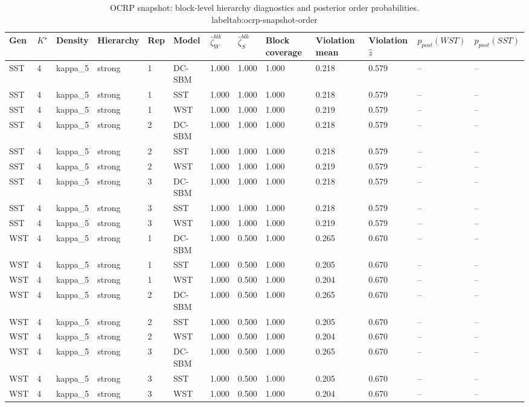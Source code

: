 \begin{table}[!h]
\centering
\caption{OCRP snapshot: block-level hierarchy diagnostics and posterior order probabilities.\\label{tab:ocrp-snapshot-order}}
\centering
\begin{tabular}[t]{lllllllllllll}
\toprule
Gen & $K^\star$ & Density & Hierarchy & Rep & Model & $\widehat\zeta_W^{blk}$ & $\widehat\zeta_S^{blk}$ & Block coverage & Violation mean & Violation $\hat z$ & $p_{post}(WST)$ & $p_{post}(SST)$\\
\midrule
SST & 4 & kappa_5 & strong & 1 & DC-SBM & 1.000 & 1.000 & 1.000 & 0.218 & 0.579 & -- & --\\
SST & 4 & kappa_5 & strong & 1 & SST & 1.000 & 1.000 & 1.000 & 0.218 & 0.579 & -- & --\\
SST & 4 & kappa_5 & strong & 1 & WST & 1.000 & 1.000 & 1.000 & 0.219 & 0.579 & -- & --\\
SST & 4 & kappa_5 & strong & 2 & DC-SBM & 1.000 & 1.000 & 1.000 & 0.218 & 0.579 & -- & --\\
SST & 4 & kappa_5 & strong & 2 & SST & 1.000 & 1.000 & 1.000 & 0.218 & 0.579 & -- & --\\
SST & 4 & kappa_5 & strong & 2 & WST & 1.000 & 1.000 & 1.000 & 0.219 & 0.579 & -- & --\\
SST & 4 & kappa_5 & strong & 3 & DC-SBM & 1.000 & 1.000 & 1.000 & 0.218 & 0.579 & -- & --\\
SST & 4 & kappa_5 & strong & 3 & SST & 1.000 & 1.000 & 1.000 & 0.218 & 0.579 & -- & --\\
SST & 4 & kappa_5 & strong & 3 & WST & 1.000 & 1.000 & 1.000 & 0.219 & 0.579 & -- & --\\
WST & 4 & kappa_5 & strong & 1 & DC-SBM & 1.000 & 0.500 & 1.000 & 0.265 & 0.670 & -- & --\\
WST & 4 & kappa_5 & strong & 1 & SST & 1.000 & 0.500 & 1.000 & 0.205 & 0.670 & -- & --\\
WST & 4 & kappa_5 & strong & 1 & WST & 1.000 & 0.500 & 1.000 & 0.204 & 0.670 & -- & --\\
WST & 4 & kappa_5 & strong & 2 & DC-SBM & 1.000 & 0.500 & 1.000 & 0.265 & 0.670 & -- & --\\
WST & 4 & kappa_5 & strong & 2 & SST & 1.000 & 0.500 & 1.000 & 0.205 & 0.670 & -- & --\\
WST & 4 & kappa_5 & strong & 2 & WST & 1.000 & 0.500 & 1.000 & 0.204 & 0.670 & -- & --\\
WST & 4 & kappa_5 & strong & 3 & DC-SBM & 1.000 & 0.500 & 1.000 & 0.265 & 0.670 & -- & --\\
WST & 4 & kappa_5 & strong & 3 & SST & 1.000 & 0.500 & 1.000 & 0.205 & 0.670 & -- & --\\
WST & 4 & kappa_5 & strong & 3 & WST & 1.000 & 0.500 & 1.000 & 0.204 & 0.670 & -- & --\\
\bottomrule
\end{tabular}
\end{table}
